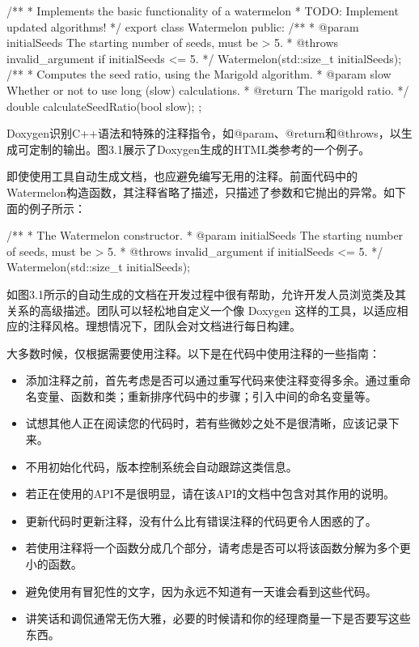 \begin{cpp}
/**
* Implements the basic functionality of a watermelon
* TODO: Implement updated algorithms!
*/
export class Watermelon
{
    public:
        /**
         * @param initialSeeds The starting number of seeds, must be > 5.
         * @throws invalid_argument if initialSeeds <= 5.
         */
        Watermelon(std::size_t initialSeeds);
        /**
         * Computes the seed ratio, using the Marigold algorithm.
         * @param slow Whether or not to use long (slow) calculations.
         * @return The marigold ratio.
         */
        double calculateSeedRatio(bool slow);
};
\end{cpp}

Doxygen识别C++语法和特殊的注释指令，如@param、@return和@throws，以生成可定制的输出。图3.1展示了Doxygen生成的HTML类参考的一个例子。

即使使用工具自动生成文档，也应避免编写无用的注释。前面代码中的Watermelon构造函数，其注释省略了描述，只描述了参数和它抛出的异常。如下面的例子所示：

\begin{cpp}
/**
 * The Watermelon constructor.
 * @param initialSeeds The starting number of seeds, must be > 5.
 * @throws invalid_argument if initialSeeds <= 5.
 */
Watermelon(std::size_t initialSeeds);
\end{cpp}


如图3.1所示的自动生成的文档在开发过程中很有帮助，允许开发人员浏览类及其关系的高级描述。团队可以轻松地自定义一个像 Doxygen 这样的工具，以适应相应的注释风格。理想情况下，团队会对文档进行每日构建。


大多数时候，仅根据需要使用注释。以下是在代码中使用注释的一些指南：

\begin{itemize}
\item
添加注释之前，首先考虑是否可以通过重写代码来使注释变得多余。通过重命名变量、函数和类；重新排序代码中的步骤；引入中间的命名变量等。

\item
试想其他人正在阅读您的代码时，若有些微妙之处不是很清晰，应该记录下来。

\item
不用初始化代码，版本控制系统会自动跟踪这类信息。

\item
若正在使用的API不是很明显，请在该API的文档中包含对其作用的说明。

\item
更新代码时更新注释，没有什么比有错误注释的代码更令人困惑的了。

\item
若使用注释将一个函数分成几个部分，请考虑是否可以将该函数分解为多个更小的函数。

\item
避免使用有冒犯性的文字，因为永远不知道有一天谁会看到这些代码。

\item
讲笑话和调侃通常无伤大雅，必要的时候请和你的经理商量一下是否要写这些东西。
\end{itemize}

